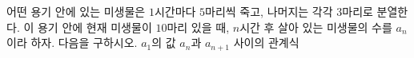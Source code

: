 어떤 용기 안에 있는 미생물은 $1$시간마다 $5$마리씩 죽고, 나머지는 각각 $3$마리로 분열한다. 이 용기 안에 현재 미생물이 $10$마리 있을 때, $n$시간 후 살아 있는 미생물의 수를 $a_n$이라 하자. 다음을 구하시오.
 $a_1$의 값
 $a_n$과 $a_{n+1}$ 사이의 관계식

